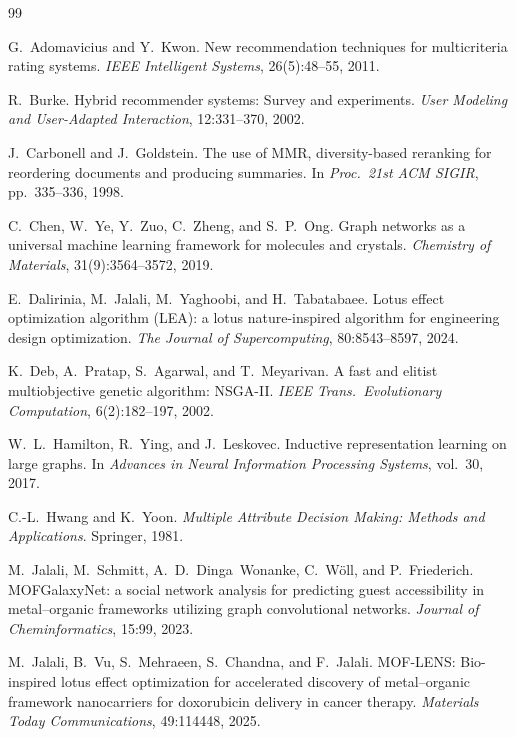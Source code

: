 \documentclass[12pt,a4paper]{article}
\begin{document}
\begin{thebibliography}{99}

 G.~Adomavicius and Y.~Kwon. New recommendation techniques for multicriteria rating systems. \textit{IEEE Intelligent Systems}, 26(5):48--55, 2011.

 R.~Burke. Hybrid recommender systems: Survey and experiments. \textit{User Modeling and User-Adapted Interaction}, 12:331--370, 2002.

 J.~Carbonell and J.~Goldstein. The use of MMR, diversity-based reranking for reordering documents and producing summaries. In \textit{Proc.\ 21st ACM SIGIR}, pp.\ 335--336, 1998.

 C.~Chen, W.~Ye, Y.~Zuo, C.~Zheng, and S.~P.~Ong. Graph networks as a universal machine learning framework for molecules and crystals. \textit{Chemistry of Materials}, 31(9):3564--3572, 2019.

 E.~Dalirinia, M.~Jalali, M.~Yaghoobi, and H.~Tabatabaee. Lotus effect optimization algorithm (LEA): a lotus nature-inspired algorithm for engineering design optimization. \textit{The Journal of Supercomputing}, 80:8543--8597, 2024.

 K.~Deb, A.~Pratap, S.~Agarwal, and T.~Meyarivan. A fast and elitist multiobjective genetic algorithm: NSGA-II. \textit{IEEE Trans.\ Evolutionary Computation}, 6(2):182--197, 2002.

 W.~L.~Hamilton, R.~Ying, and J.~Leskovec. Inductive representation learning on large graphs. In \textit{Advances in Neural Information Processing Systems}, vol.\ 30, 2017.

 C.-L.~Hwang and K.~Yoon. \textit{Multiple Attribute Decision Making: Methods and Applications}. Springer, 1981.

 M.~Jalali, M.~Schmitt, A.~D.~Dinga~Wonanke, C.~W\"{o}ll, and P.~Friederich. MOFGalaxyNet: a social network analysis for predicting guest accessibility in metal--organic frameworks utilizing graph convolutional networks. \textit{Journal of Cheminformatics}, 15:99, 2023.

 M.~Jalali, B.~Vu, S.~Mehraeen, S.~Chandna, and F.~Jalali. MOF-LENS: Bio-inspired lotus effect optimization for accelerated discovery of metal--organic framework nanocarriers for doxorubicin delivery in cancer therapy. \textit{Materials Today Communications}, 49:114448, 2025.


\end{thebibliography}
\end{document}
